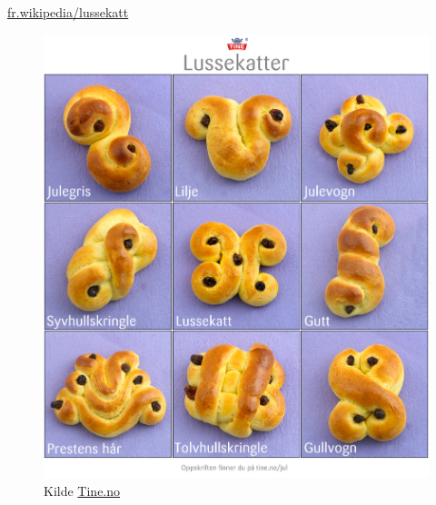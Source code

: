 \href{https://fr.wikipedia.org/wiki/Lussekatt}{fr.wikipedia/lussekatt}


\begin{figure}[p]
	\includegraphics[width=\textwidth]{bilder/lussekatter.png}
	\caption{Kilde \href{http://www.tine.no/imageresize/383493_999_1150.png}{Tine.no}}
\end{figure}
